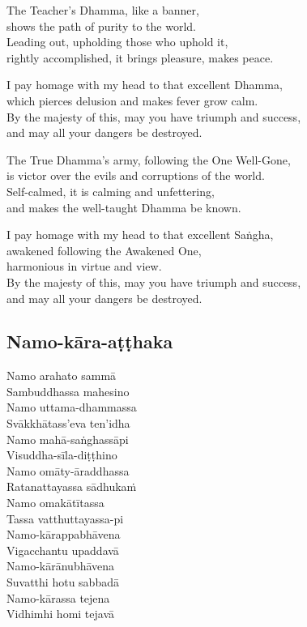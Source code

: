 The Teacher's Dhamma, like a banner,\\
shows the path of purity to the world.\\
Leading out, upholding those who uphold it,\\
rightly accomplished, it brings pleasure, makes peace.

I pay homage with my head to that excellent Dhamma,\\
which pierces delusion and makes fever grow calm.\\
By the majesty of this, may you have triumph and success,\\
and may all your dangers be destroyed.

The True Dhamma's army, following the One Well-Gone,\\
is victor over the evils and corruptions of the world.\\
Self-calmed, it is calming and unfettering,\\
and makes the well-taught Dhamma be known.

I pay homage with my head to that excellent Saṅgha,\\
awakened following the Awakened One,\\\vin harmonious in virtue and view.\\
By the majesty of this, may you have triumph and success,\\
and may all your dangers be destroyed.

\subsection{Namo-kāra-aṭṭhaka}
\label{namo-arahato}


\begin{paritta}
  Namo arahato sammā\\
  Sambuddhassa mahesino\\
  Namo uttama-dhammassa\\
  Svākkhātass'eva ten'idha\\
  Namo mahā-saṅghassāpi\\
  Visuddha-sīla-diṭṭhino\\
  Namo omāty-āraddhassa\\
  Ratanattayassa sādhukaṁ\\
  Namo omakātītassa\\
  Tassa vatthuttayassa-pi\\
  Namo-kārappabhāvena\\
  Vigacchantu upaddavā\\
  Namo-kārānubhāvena\\
  Suvatthi hotu sabbadā\\
  Namo-kārassa tejena\\
  Vidhimhi homi tejavā
\end{paritta}

